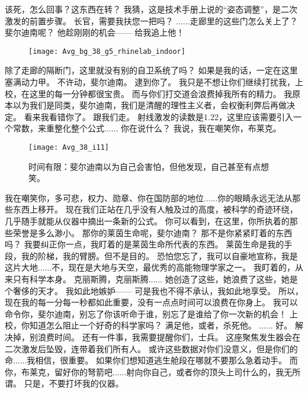 \documentclass[openany]{book}
\begin{document}
\begin{dialogue}
     该死，怎么回事？这东西在转？
     我猜，这是技术手册上说的“姿态调整”，是二次激发的前置步骤。
     长官，需要我扶您一把吗？
     ......走廊里的这些门怎么关上了？斐尔迪南呢？
     他趁刚刚的机会——
     给我追上他！
    \begin{figure}[h]
        \centering
        \texttt{[image: Avg\_bg\_38\_g5\_rhinelab\_indoor]}
    \end{figure}
     除了走廊的隔断门，这里就没有别的自卫系统了吗？
     如果是我的话，一定在这里塞满动力甲。
     不许动，斐尔迪南。
     逮到你了。
     我只是不想让你们继续打扰我，上校，在这里的每一分钟都很宝贵。
     而与你们打交道会浪费掉我所有的精力。
     我原本以为我们是同类，斐尔迪南，我们是清醒的理性主义者，会权衡利弊后再做决定。
     看来我看错你了。
     跟我们走。
     射线激发的读数是1.22，这里应该需要引入一个常数，来重整化整个公式......
     你在说什么？
     我说，我在嘲笑你，布莱克。
    \begin{figure}[h]
        \caption*{时间有限：斐尔迪南以为自己会害怕，但他发现，自己甚至有点想笑。}
        \centering
        \texttt{[image: Avg\_38\_i11]}
    \end{figure}
     我在嘲笑你，多可悲，权力、勋章、你在国防部的地位......你的眼睛永远无法从那些东西上移开。
     现在我们正站在几乎没有人触及过的高度，被科学的奇迹环绕，几乎随手就能从仪器中摘出一条新的公式。
     你可以看到，在这里，你所执着的那些荣誉是多么渺小。
     那你的莱茵生命呢，斐尔迪南？
     那不是你紧紧盯着的东西吗？
     我要纠正你一点，我盯着的是莱茵生命所代表的东西。
     莱茵生命是我的手段，我的阶梯，我的臂膀。但不是目的。
     恐怕您忘了，我可以自豪地宣称，我是这片大地......不，现在是大地与天空，最优秀的高能物理学家之一。
     我盯着的，从来只有科学本身。
     克丽斯腾，克丽斯腾......
     她创造了这些，她浪费了这些，她是个奢侈的天才。
     我如此地嫉妒——
     可是我也不得不承认，我如此地享受。
     所以，现在我的每一分每一秒都如此重要，没有一点点时间可以浪费在你身上。
     我可以命令你，斐尔迪南，别忘了你该听命于谁，别忘了是谁给了你一次新的机会！
     上校，你知道怎么阻止一个好奇的科学家吗？
     满足他，或者，杀死他。
     ......
     好。
     解决掉，别浪费时间。
     还有一件事，我需要提醒你们，士兵。
     这座聚焦发生器会在二次激发后坠毁，连带着我们所有人。
     或许这些数据对你们没意义，但是你们的命......我相信，很重要。
     如果你们想知道逃生舱段在哪就不要那么急着动手。
     而你，布莱克，留好你的弩箭吧......射向你自己，或者你的顶头上司什么的，我无所谓。
     只是，不要打坏我的仪器。
\end{dialogue}
\end{document}
